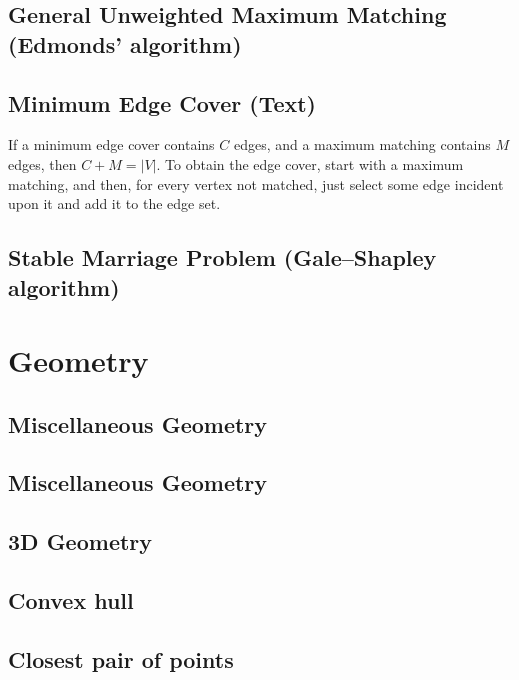 \documentclass[9pt]{extarticle}
\begin{document}
\begin{multicols}{3}
\subsection{General Unweighted Maximum Matching (Edmonds' algorithm)}


\subsection{Minimum Edge Cover (Text)}
If a minimum edge cover contains $C$ edges, and a maximum matching contains $M$ edges, then $C + M = |V|$. To obtain the edge cover, start with a maximum matching, and then, for every vertex not matched, just select some edge incident upon it and add it to the edge set. 

\subsection{Stable Marriage Problem (Gale--Shapley algorithm)}


\section{Geometry}

\subsection{Miscellaneous Geometry}


\subsection{Miscellaneous Geometry}


\subsection{3D Geometry}


\subsection{Convex hull}


\subsection{Closest pair of points}



\end{multicols}
\end{document}
